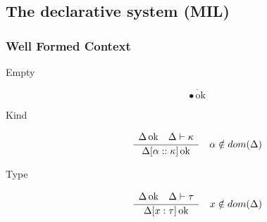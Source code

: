 \documentclass[12pt,twoside,fleqn]{amsart}
\theoremstyle{plain}
\theoremstyle{plain}
\theoremstyle{definition}
\begin{document}
\newcommand{\infrule}[2]{\frac{#1 }{#2 }}

\newcommand{\axiom}[1]{\overline{#1 }}

\newcommand{\deltaok}[1]{#1 \, \mathrm{ok}}

\newcommand{\kindok}[2]{#1 \vdash #2 }

\newcommand{\kok}[1]{\kindok{\context }{#1 }}

\newcommand{\typeok}[2]{#1 \vdash #2 }

\newcommand{\tok}[1]{\typeok{\context }{#1 }}

\newcommand{\conok}[3]{#1 \vdash #2 ::#3 }

\newcommand{\cok}[2]{\conok{\context }{#1 }{#2 }}

\newcommand{\klessthan}[3]{#1 \vdash #2 \preceq #3 }

\newcommand{\klt}[2]{\klessthan{\context }{#1 }{#2 }}

\newcommand{\eqcon}[4]{#1 \vdash #2 \equiv #3 ::#4 }

\newcommand{\eqtype}[3]{#1 \vdash #2 \equiv #3 }

\newcommand{\expok}[3]{#1 \vdash #2 :#3 }

\newcommand{\eok}[2]{\expok{\context }{#1 }{#2 }}



\subsection{The declarative system (MIL)}


\subsubsection{Well Formed Context }

\begin{description}
\item [Empty]
\[
\axiom{\deltaok{\bullet }}\]

\item [Kind]
\[
\infrule{\begin{array}{ll}
\deltaok{\context } & \kok{\kappa }
\end{array}}{\deltaok{\caddk{\alpha }{\kappa }}}\quad \alpha \notin dom(\context )\]

\item [Type]
\[
\infrule{\begin{array}{ll}
\deltaok{\context } & \tok{\tau }
\end{array}}{\deltaok{\caddt{x}{\tau }}}\quad x\notin dom(\context )\]

\end{description}
\end{document}
